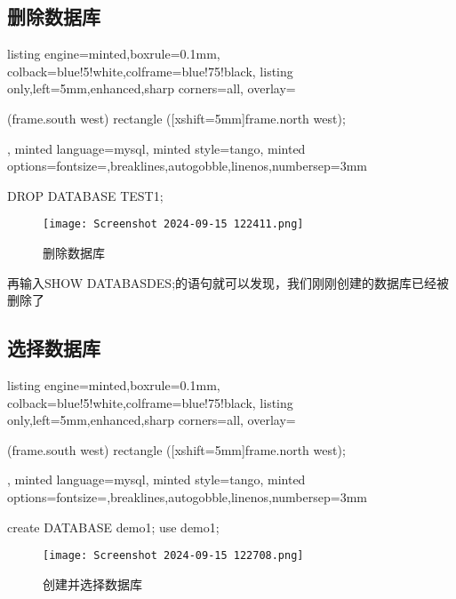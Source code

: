 \documentclass[12pt]{article}
\begin{document}
\subsection{删除数据库}
\begin{tcblisting}{listing engine=minted,boxrule=0.1mm,
colback=blue!5!white,colframe=blue!75!black,
listing only,left=5mm,enhanced,sharp corners=all,
overlay={\begin{tcbclipinterior} (frame.south west)
rectangle ([xshift=5mm]frame.north west);\end{tcbclipinterior}},
minted language=mysql,
minted style=tango,
minted options={fontsize=\small,breaklines,autogobble,linenos,numbersep=3mm}}
DROP DATABASE TEST1;
\end{tcblisting}
\begin{figure}[htbp]
    \centering
    \texttt{[image: Screenshot 2024-09-15 122411.png]}
    \caption{删除数据库}
    \label{fig:enter-label}
\end{figure}
{\songti 再输入SHOW DATABASDES;的语句就可以发现，我们刚刚创建的数据库已经被删除了}
\subsection{选择数据库}
\begin{tcblisting}{listing engine=minted,boxrule=0.1mm,
colback=blue!5!white,colframe=blue!75!black,
listing only,left=5mm,enhanced,sharp corners=all,
overlay={\begin{tcbclipinterior} (frame.south west)
rectangle ([xshift=5mm]frame.north west);\end{tcbclipinterior}},
minted language=mysql,
minted style=tango,
minted options={fontsize=\small,breaklines,autogobble,linenos,numbersep=3mm}}
create DATABASE demo1;
use demo1;
\end{tcblisting}
\begin{figure}[htbp]
    \centering
    \texttt{[image: Screenshot 2024-09-15 122708.png]}
    \caption{创建并选择数据库}
    \label{fig:enter-label}
\end{figure}
\end{document}

